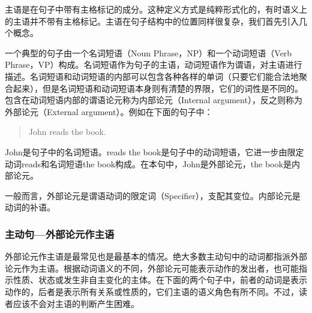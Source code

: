 {{主语是在句子中带有主格标记的成分。这种定义方式是纯粹形式化的，有时语义上的主语并不带有主格标记。主语在句子结构中的位置同样很复杂，我们首先引入几个概念。

一个典型的句子由一个名词短语（Noun Phrase，NP）和一个动词短语（Verb
Phrase，VP）构成。名词短语作为句子的主语，动词短语作为谓语，对主语进行描述。名词短语和动词短语的内部可以包含各种各样的单词（只要它们能合法地聚合起来），但是名词短语和动词短语本身则有清楚的界限，它们的词性是不同的。包含在动词短语内部的谓语论元称为内部论元（Internal
argument），反之则称为外部论元（External
argument）。例如在下面的句子中：

\begin{quote}
John reads the book.
\end{quote}

John是句子中的名词短语。reads the
book是句子中的动词短语，它进一步由限定动词reads和名词短语the
book构成。在本句中，John是外部论元，the book是内部论元。

一般而言，外部论元是谓语动词的限定词（Specifier），支配其变位。内部论元是动词的补语。

\subsubsection{主动句---外部论元作主语}\label{主动句---外部论元作主语}

外部论元作主语是最常见也是最基本的情况。绝大多数主动句中的动词都指派外部论元作为主语。根据动词语义的不同，外部论元可能表示动作的发出者，也可能指示性质、状态或发生非自主变化的主体。在下面的两个句子中，前者的动词是表示动作的，后者是表示所有关系或性质的，它们主语的语义角色有所不同。不过，读者应该不会对主语的判断产生困难。

}}
